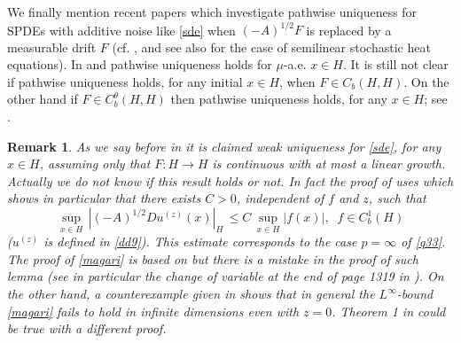 \documentclass[preprint]{imsart}
\newtheorem{remark}[theorem]{Remark}
\begin{document}
 
 
  We finally mention 
  recent papers 
 which investigate  pathwise uniqueness for  SPDEs with additive noise like \eqref{sde} 
 when  $(-A)^{1/2}F$ is replaced by a measurable drift   $F$ 
 (cf. \cite{DFPR}, \cite{DFRV}  and  see also \cite{mytnik} for the case of semilinear stochastic heat equations). 
  In \cite{DFPR} and  \cite{DFRV} pathwise uniqueness holds for $\mu$-a.e.  $x \in H$. It is still not clear if  pathwise uniqueness holds, for any initial  $x \in H$, when   $F \in C_b(H,H)$.   
 On the other hand if $F \in C_b^{\theta}(H,H)$ then pathwise uniqueness holds, for any $x \in H$; see  \cite{DF}. 

 \begin{remark} \label{peccato} {\em As we say before in \cite[Theorem 1]{priolaAOP} it is claimed weak uniqueness for \eqref{sde}, for any  $x \in H$, assuming only that $F: H \to H$ is continuous with at most a linear growth. Actually we do not know if this result holds or not. 
In fact the proof of \cite[Theorem 1]{priolaAOP}  uses    \cite[Theorem 7]{priolaAOP} which 
 shows in particular that 
 there exists $C >0$, independent of $f$ and $z$, such that 
\begin{equation}\label{magari}         
 \sup_{x \in H}\, | (-A)^{1/2} Du^{(z)} (x)|_H \, \le C\,  \sup_{x \in H}| f(x)|,\;\; f \in C_b^1(H)
\end{equation}
 ($u^{(z)}$ is defined in \eqref{dd9}).  This estimate corresponds to the case $p =\infty$ of \eqref{q33}.  The proof of   \eqref{magari} is  based on \cite[Lemma 6]{priolaAOP} but there is a mistake in the proof of such lemma (see in particular the change of variable at the end of page 1319 in \cite{priolaAOP}). On the other hand, a counterexample given in  \cite{doleraP} shows that in general the  $L^{\infty}$-bound  \eqref{magari}   fails to hold in  infinite dimensions even with $z=0$.  %
  Theorem 1 in \cite{priolaAOP} could be true with a different proof.
   } 
\end{remark}
\end{document}

